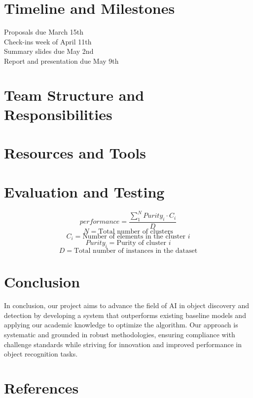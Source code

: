 \documentclass{article}
\begin{document}
	\section{Timeline and Milestones}
	Proposals due March 15th\\
	Check-ins week of April 11th\\
	Summary slides due May 2nd\\
	Report and presentation due May 9th\\
	
	\section{Team Structure and Responsibilities}
	
	\section{Resources and Tools}
	
	\section{Evaluation and Testing}
	$$performance = \frac{\sum_{1}^{N}Purity_{i} \cdot C_{i}}{D}$$
	$$N = \textrm{Total number of clusters}$$
	$$C_{i} = \textrm{Number of elements in the cluster } i$$
	$$Purity_{i} = \textrm{Purity of cluster } i$$
	$$D = \textrm{Total number of instances in the dataset}$$
	
	\section{Conclusion}
	In conclusion, our project aims to advance the field of AI in object discovery and detection by developing a system that outperforms existing baseline models and applying our academic knowledge to optimize the algorithm. Our approach is systematic and grounded in robust methodologies, ensuring compliance with challenge standards while striving for innovation and improved performance in object recognition tasks.
	
	
	
	\section*{References}
	
	
	
\end{document}
